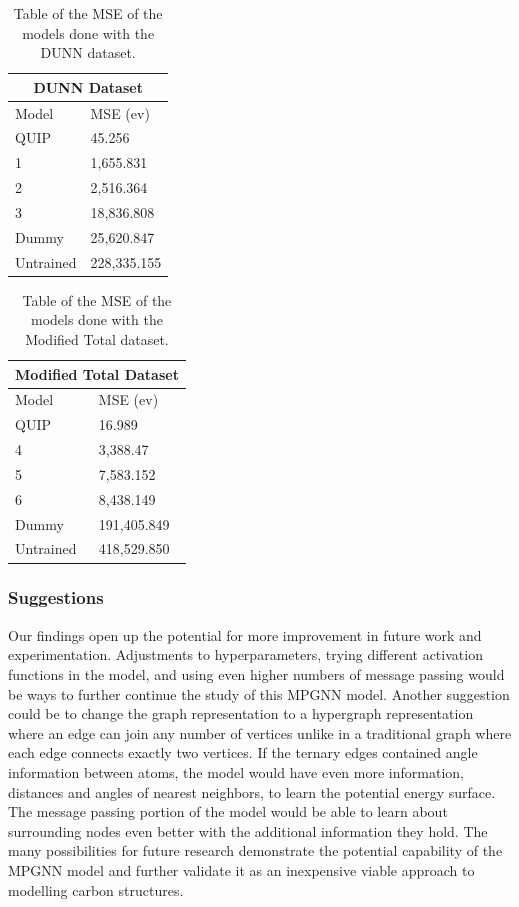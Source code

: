 \documentclass[12pt, abstract = true]{scrartcl}
\begin{document}
\begin{table}
    \centering
    \begin{tabular}{p{3cm}|p{2.5cm}}
    \hline
    \multicolumn{2}{|c|}{DUNN Dataset} \\
    \hline
    Model  & MSE (ev)\\
    \hline
    QUIP   & 45.256\\
    1   & 1,655.831\\
    2    & 2,516.364\\
    3 & 18,836.808\\
    Dummy & 25,620.847\\
    Untrained & 228,335.155\\
    \hline
    \end{tabular}
    \caption{Table of the MSE of the models done with the DUNN dataset.}\label{tab:dunn}
\end{table}

\begin{table}
    \centering
    \begin{tabular}{p{3cm}|p{2.5cm}}
    \hline
    \multicolumn{2}{|c|}{Modified Total Dataset} \\
    \hline
    Model  & MSE (ev)\\
    \hline
    QUIP   & 16.989 \\
    4   & 3,388.47 \\
    5 & 7,583.152 \\
    6    & 8,438.149\\
    Dummy & 191,405.849 \\
    Untrained & 418,529.850\\
    \hline
    \end{tabular}
    \caption{Table of the MSE of the models done with the Modified Total dataset.}\label{tab:total}
\end{table}


\subsubsection{Suggestions} 

Our findings open up the potential for more improvement in future work and experimentation. Adjustments to hyperparameters, trying different activation functions in the model, and using even higher numbers of message passing would be ways to further continue the study of this MPGNN model. Another suggestion could be to change the graph representation to a hypergraph representation where an edge can join any number of vertices unlike in a traditional graph where each edge connects exactly two vertices. If the ternary edges contained angle information between atoms, the model would have even more information, distances and angles of nearest neighbors, to learn the potential energy surface. The message passing portion of the model would be able to learn about surrounding nodes even better with the additional information they hold. The many possibilities for future research demonstrate the potential capability of the MPGNN model and further validate it as an inexpensive viable approach to modelling carbon structures.


\newpage



\end{document}
